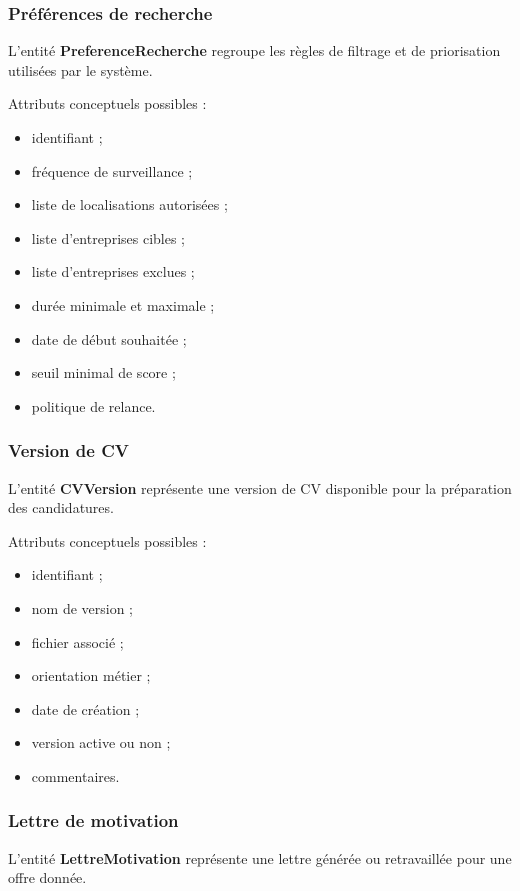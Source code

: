 \documentclass[11pt,a4paper]{article}
\begin{document}
\subsubsection{Préférences de recherche}

L’entité \textbf{PreferenceRecherche} regroupe les règles de filtrage et de priorisation utilisées par le système.

Attributs conceptuels possibles :
\begin{itemize}
    \item identifiant ;
    \item fréquence de surveillance ;
    \item liste de localisations autorisées ;
    \item liste d’entreprises cibles ;
    \item liste d’entreprises exclues ;
    \item durée minimale et maximale ;
    \item date de début souhaitée ;
    \item seuil minimal de score ;
    \item politique de relance.
\end{itemize}

\subsubsection{Version de CV}

L’entité \textbf{CVVersion} représente une version de CV disponible pour la préparation des candidatures.

Attributs conceptuels possibles :
\begin{itemize}
    \item identifiant ;
    \item nom de version ;
    \item fichier associé ;
    \item orientation métier ;
    \item date de création ;
    \item version active ou non ;
    \item commentaires.
\end{itemize}

\subsubsection{Lettre de motivation}

L’entité \textbf{LettreMotivation} représente une lettre générée ou retravaillée pour une offre donnée.
\end{document}
